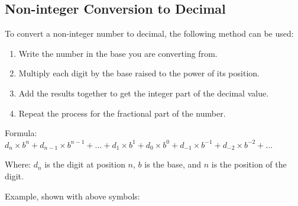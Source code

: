 \documentclass{article}
\begin{document}
\newpage

\subsection*{Non-integer Conversion to Decimal}

\noindent To convert a non-integer number to decimal, the following method can be used:

\begin{enumerate}
    \item Write the number in the base you are converting from.
    \item Multiply each digit by the base raised to the power of its position.
    \item Add the results together to get the integer part of the decimal value.
    \item Repeat the process for the fractional part of the number.
\end{enumerate}

\vspace*{0.25cm}

\noindent Formula: $d_n \times b^n + d_{n-1} \times b^{n-1} + \ldots + d_1 \times b^1 + d_0 \times b^0 + d_{-1} \times b^{-1} + d_{-2} \times b^{-2} + \ldots$

\vspace*{0.25cm}

\noindent Where: $d_n$ is the digit at position $n$, $b$ is the base, and $n$ is the position of the digit.

\vspace*{0.25cm}

\noindent Example, shown with above symbols:

\vspace*{0.5cm}

\end{document}
